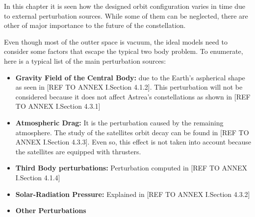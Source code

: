 \label{TypesPerturb}

In this chapter it is seen how the designed orbit configuration varies in time due to external perturbation sources. While some of them can be neglected, there are other of major importance to the future of the constellation.

Even though most of the outter space is vacuum, the ideal models need to consider some factors that escape the typical two body problem. To enumerate, here is a typical list of the main perturbation sources:

\begin{itemize}
\item \textbf{Gravity Field of the Central Body:} due to the Earth's aspherical shape as seen in [REF TO ANNEX I.Section 4.1.2]. This perturbation will not be considered because it does not affect Astrea's constellations as shown in [REF TO ANNEX I.Section 4.3.1]
\item \textbf{Atmospheric Drag:} It is the perturbation caused by the remaining atmosphere. The study of the satellites orbit decay can be found in [REF TO ANNEX I.Section 4.3.3]. Even so, this effect is not taken into account because the satellites are equipped with thrusters.
\item \textbf{Third Body perturbations:} Perturbation computed in [REF TO ANNEX I.Section 4.1.4]
\item \textbf{Solar-Radiation Pressure:} Explained in [REF TO ANNEX I.Section 4.3.2]
\item \textbf{Other Perturbations}
\end{itemize}
